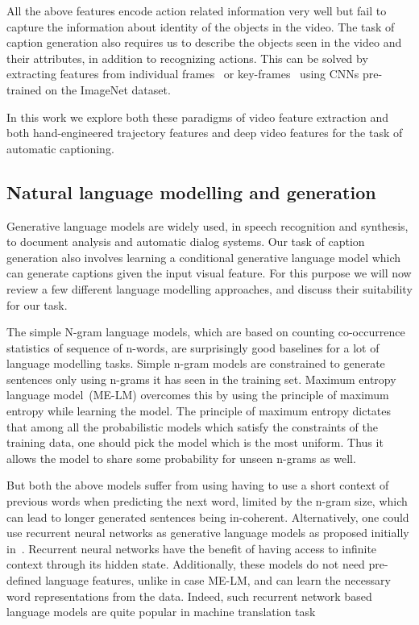 All the above features encode action related information very well but fail to
capture the information about identity of the objects in the video.
The task of caption generation also requires us to describe the objects seen in
the video and their attributes, in addition to recognizing actions.
This can be solved by extracting features from individual
frames~\cite{venugopalan2015sequence} or key-frames~\cite{shetty2015video} using
CNNs pre-trained on the ImageNet dataset.

In this work we explore both these paradigms of video feature extraction and
both hand-engineered trajectory features and deep video features for the task of
automatic captioning.
\subsection{Natural language modelling and generation}
Generative language models are widely used, in speech recognition and synthesis,
to document analysis and automatic dialog systems.
Our task of caption generation also involves learning a conditional generative language
model which can generate captions given the input visual feature.
For this purpose we will now review a few different language modelling
approaches, and discuss their suitability for our task.

The simple N-gram language models, which are based on counting co-occurrence
statistics of sequence of n-words, are surprisingly good baselines for a lot of
language modelling tasks.
Simple n-gram models are constrained to generate sentences only using n-grams it
has seen in the training set.
Maximum entropy language model~\cite{berger1996maximum}(ME-LM) overcomes this by using
the principle of maximum entropy while learning the model.
The principle of maximum entropy dictates that among all the probabilistic
models which satisfy the constraints of the training data, one should pick the
model which is the most uniform.
Thus it allows the model to share some probability for unseen n-grams as well.

But both the above models suffer from using having to use a short context of previous
words when predicting the next word, limited by the n-gram size, which can lead
to longer generated sentences being in-coherent.
Alternatively, one could use recurrent neural networks as generative language
models as proposed initially in~\cite{sutskever2014sequence}.
Recurrent neural networks have the benefit of having access to infinite context
through its hidden state.
Additionally, these models do not need pre-defined language features, unlike in case
ME-LM, and can learn the necessary word representations from the data. 
Indeed, such recurrent network based language models are quite popular in
machine translation task~\cite{bahdanau2014neural}

